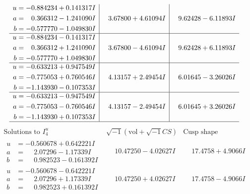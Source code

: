 \documentclass[1p]{elsarticle_modified}
\theoremstyle{definition}
\newcommand{\I}{\sqrt{-1}}
\begin{document}
$$\begin{array}{c|c|c}
\begin{aligned}
u &= -0.884234 + 0.141317 I \\
a &= \phantom{-}0.366312 - 1.241090 I \\
b &= -0.577770 - 1.049830 I\end{aligned}
 & \phantom{-}3.67800 + 4.61094 I & \phantom{-}9.62428 - 6.11893 I \\ \hline\begin{aligned}
u &= -0.884234 - 0.141317 I \\
a &= \phantom{-}0.366312 + 1.241090 I \\
b &= -0.577770 + 1.049830 I\end{aligned}
 & \phantom{-}3.67800 - 4.61094 I & \phantom{-}9.62428 + 6.11893 I \\ \hline\begin{aligned}
u &= -0.633213 + 0.947549 I \\
a &= -0.775053 + 0.760546 I \\
b &= -1.143930 - 0.107353 I\end{aligned}
 & \phantom{-}4.13157 + 2.49454 I & \phantom{-}6.01645 - 3.26026 I \\ \hline\begin{aligned}
u &= -0.633213 - 0.947549 I \\
a &= -0.775053 - 0.760546 I \\
b &= -1.143930 + 0.107353 I\end{aligned}
 & \phantom{-}4.13157 - 2.49454 I & \phantom{-}6.01645 + 3.26026 I\\
 \hline 
 \end{array}$$\newpage$$\begin{array}{c|c|c}  
\text{Solutions to }I^u_{4}& \I (\text{vol} + \sqrt{-1}CS) & \text{Cusp shape}\\
 \hline 
\begin{aligned}
u &= -0.560678 + 0.642221 I \\
a &= \phantom{-}2.07296 - 1.17339 I \\
b &= \phantom{-}0.982523 - 0.161392 I\end{aligned}
 & \phantom{-}10.47250 - 4.02627 I & \phantom{-}17.4758 + 4.9066 I \\ \hline\begin{aligned}
u &= -0.560678 - 0.642221 I \\
a &= \phantom{-}2.07296 + 1.17339 I \\
b &= \phantom{-}0.982523 + 0.161392 I\end{aligned}
 & \phantom{-}10.47250 + 4.02627 I & \phantom{-}17.4758 - 4.9066 I \\ \hline\begin{aligned}

\end{aligned}
\end{array}$$
\end{document}
